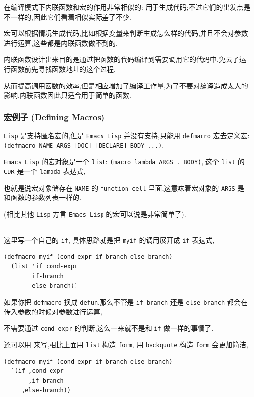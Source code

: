 \documentclass[11pt]{article}
\begin{document}
在编译模式下内联函数和宏的作用非常相似的: 用于生成代码;不过它们的出发点是不一样的,因此它们看着相似实际差了不少.

宏可以根据情况生成代码,比如根据变量来判断生成怎么样的代码,并且不会对参数进行运算,这些都是内联函数做不到的,

内联函数设计出来目的是通过把函数的代码编译到需要调用它的代码中,免去了运行函数前先寻找函数地址的这个过程,

从而提高调用函数的效率,但是相应增加了编译工作量,为了不要对编译造成太大的影响,内联函数因此只适合用于简单的函数.


\subsubsection{宏例子 (Defining Macros)}
\label{sec:org6979f02}

\texttt{Lisp} 是支持匿名宏的,但是 \texttt{Emacs Lisp} 并没有支持,只能用 \texttt{defmacro} 宏去定义宏: \texttt{(defmacro NAME ARGS [DOC] [DECLARE] BODY ...)}.

\texttt{Emacs Lisp} 的宏对象是一个 \texttt{list}: \texttt{(macro lambda ARGS . BODY)}, 这个 \texttt{list} 的 \texttt{CDR} 是一个 \texttt{lambda} 表达式,

也就是说宏对象储存在 \texttt{NAME} 的 \texttt{function cell} 里面,这意味着宏对象的 \texttt{ARGS} 是和函数的参数列表一样的.

(相比其他 \texttt{Lisp} 方言 \texttt{Emacs Lisp} 的宏可以说是非常简单了).

\\[0pt]

这里写一个自己的 \texttt{if}, 具体思路就是把 \texttt{myif} 的调用展开成 \texttt{if} 表达式,

\begin{verbatim}
(defmacro myif (cond-expr if-branch else-branch)
  (list 'if cond-expr
        if-branch
        else-branch))
\end{verbatim}

如果你把 \texttt{defmacro} 换成 \texttt{defun},那么不管是 \texttt{if-branch} 还是 \texttt{else-branch} 都会在传入参数的时候对参数进行运算,

不需要通过 \texttt{cond-expr} 的判断,这么一来就不是和 \texttt{if} 做一样的事情了.

还可以用  来写,相比上面用 \texttt{list} 构造 \texttt{form}, 用 \texttt{backquote} 构造 \texttt{form} 会更加简洁,

\begin{verbatim}
(defmacro myif (cond-expr if-branch else-branch)
  `(if ,cond-expr
       ,if-branch
     ,else-branch))
\end{verbatim}
\end{document}
